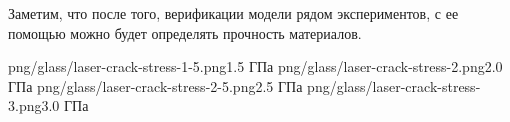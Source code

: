 \documentclass[thesis.tex]{subfiles}
\begin{document}
Заметим, что после того, верификации модели рядом экспериментов, с ее помощью можно будет определять прочность материалов.


       {png/glass/laser-crack-stress-1-5.png}{1.5 ГПа}
       {png/glass/laser-crack-stress-2.png}{2.0 ГПа}
       {png/glass/laser-crack-stress-2-5.png}{2.5 ГПа}
       {png/glass/laser-crack-stress-3.png}{3.0 ГПа}
\end{document}
